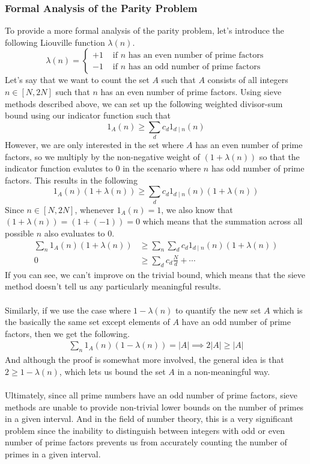 \documentclass[10pt]{extarticle}
\begin{document}
\subsubsection{Formal Analysis of the Parity Problem}
To provide a more formal analysis of the parity problem, let's introduce the following Liouville function $\lambda(n)$.
$$
\lambda(n) = \begin{cases}
  +1 & \text{ if } n \text{ has an even number of prime factors}\\
  -1 & \text{ if } n \text{ has an odd number of prime factors}
\end{cases}
$$
Let's say that we want to count the set $A$ such that $A$ consists of all integers $n \in [N,2N]$ such that $n$ has an even number of prime factors. Using sieve methods described above, we can set up the following weighted divisor-sum bound using our indicator function such that
$$
1_A(n) \geq \sum_{d} c_d 1_{d \mid n} (n)
$$
However, we are only interested in the set where $A$ has an even number of prime factors, so we multiply by the non-negative weight of $(1 + \lambda(n))$ so that the indicator function evalutes to $0$ in the scenario where $n$ has odd number of prime factors. This results in the following
$$
1_A(n) (1 + \lambda(n)) \geq \sum_{d} c_d 1_{d \mid n} (n) (1 + \lambda(n))
$$
Since $n \in [N,2N]$, whenever $1_A(n) = 1$, we also know that $(1 + \lambda(n)) = (1 + (-1)) = 0$ which means that the summation across all possible $n$ also evaluates to $0$.
\begin{align*}
  \sum_{n} 1_A(n) (1 + \lambda(n)) &\geq \sum_{n} \sum_{d} c_d 1_{d \mid n} (n) (1 + \lambda(n))\\
  0 &\geq \sum_{d} c_d \frac{N}{d} + \cdots
\end{align*}
If you can see, we can't improve on the trivial bound, which means that the sieve method doesn't tell us any particularly meaningful results.\\
\\
Similarly, if we use the case where $1 -\lambda(n)$ to quantify the new set $A$ which is the basically the same set except elements of $A$ have an odd number of prime factors, then we get the following.
\begin{align*}
  \sum_{n} 1_A(n) (1 - \lambda(n)) = |A| \implies 2|A| \geq |A|
\end{align*}
And although the proof is somewhat more involved, the general idea is that $2 \geq 1 - \lambda(n)$, which lets us bound the set $A$ in a non-meaningful way.\\
\\
Ultimately, since all prime numbers have an odd number of prime factors, sieve methods are unable to provide non-trivial lower bounds on the number of primes in a given interval. 
And in the field of number theory, this is a very significant problem since the inability to distinguish between integers with odd or even number of prime factors prevents us from accurately counting the number of primes in a given interval.
\end{document}

